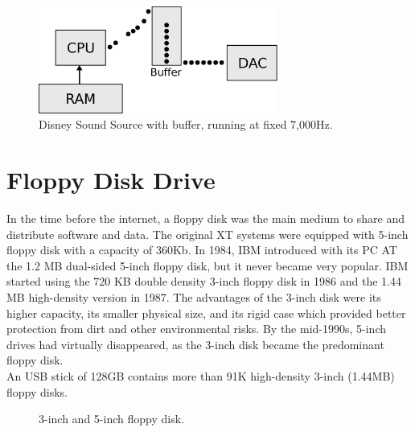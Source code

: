 \documentclass[book.tex]{subfiles}
\begin{document}
\par
 \begin{figure}[H]
\centering
\includegraphics[width=0.7\textwidth]{imgs/drawings/DSS_buffer.eps}
\caption{Disney Sound Source with buffer, running at fixed 7,000Hz.}
\label{fig:DSS_buffer}
\end{figure}

  

\section{Floppy Disk Drive}
In the time before the internet, a floppy disk was the main medium to share and distribute software and data. The original XT systems were equipped with 5-inch floppy disk with a capacity of 360Kb. In 1984, IBM introduced with its PC AT the 1.2 MB dual-sided 5-inch floppy disk, but it never became very popular. IBM started using the 720 KB double density 3-inch floppy disk in 1986 and the 1.44 MB high-density version in 1987. The advantages of the 3-inch disk were its higher capacity, its smaller physical size, and its rigid case which provided better protection from dirt and other environmental risks. By the mid-1990s, 5-inch drives had virtually disappeared, as the 3-inch disk became the predominant floppy disk. \\

\vspace{10pt}
 An USB stick of 128GB contains more than 91K high-density 3-inch (1.44MB) floppy disks.\\
\par

\begin{figure}[H]

  \begin{minipage}{0.48\textwidth}
  \centering
  \end{minipage}
  \hfill
  \begin{minipage}{0.48\textwidth}
  \centering
  \end{minipage}
  \caption{3-inch and 5-inch floppy disk.}
  \end{figure}
\par
\end{document}
